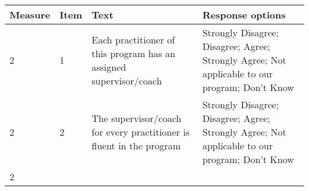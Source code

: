 \documentclass[]{article}
\begin{document}
\begin{longtable}[]{@{}llll@{}}
\toprule
\begin{minipage}[b]{0.05\columnwidth}\raggedright\strut
Measure\strut
\end{minipage} & \begin{minipage}[b]{0.04\columnwidth}\raggedright\strut
Item\strut
\end{minipage} & \begin{minipage}[b]{0.41\columnwidth}\raggedright\strut
Text\strut
\end{minipage} & \begin{minipage}[b]{0.39\columnwidth}\raggedright\strut
Response options\strut
\end{minipage}\tabularnewline
\midrule
\endhead
\begin{minipage}[t]{0.05\columnwidth}\raggedright\strut
2\strut
\end{minipage} & \begin{minipage}[t]{0.04\columnwidth}\raggedright\strut
1\strut
\end{minipage} & \begin{minipage}[t]{0.41\columnwidth}\raggedright\strut
Each practitioner of this program has an assigned supervisor/coach\strut
\end{minipage} & \begin{minipage}[t]{0.39\columnwidth}\raggedright\strut
Strongly Disagree; Disagree; Agree; Strongly Agree; Not applicable to
our program; Don't Know\strut
\end{minipage}\tabularnewline
\begin{minipage}[t]{0.05\columnwidth}\raggedright\strut
2\strut
\end{minipage} & \begin{minipage}[t]{0.04\columnwidth}\raggedright\strut
2\strut
\end{minipage} & \begin{minipage}[t]{0.41\columnwidth}\raggedright\strut
The supervisor/coach for every practitioner is fluent in the
program\strut
\end{minipage} & \begin{minipage}[t]{0.39\columnwidth}\raggedright\strut
Strongly Disagree; Disagree; Agree; Strongly Agree; Not applicable to
our program; Don't Know\strut
\end{minipage}\tabularnewline
\begin{minipage}[t]{0.05\columnwidth}\raggedright\strut
2\strut
\end{minipage} & \begin{minipage}[t]{0.04\columnwidth}\raggedright\strut

\end{minipage}
\end{longtable}
\end{document}

